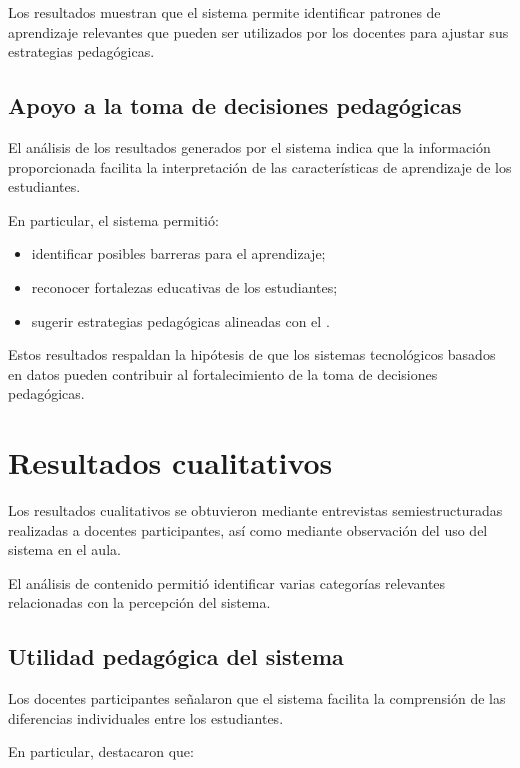 \begin{refsection}
\begin{table}[htbp]
\end{table}

Los resultados muestran que el sistema permite identificar patrones de aprendizaje relevantes que pueden ser utilizados por los docentes para ajustar sus estrategias pedagógicas.

\subsection{Apoyo a la toma de decisiones pedagógicas}

El análisis de los resultados generados por el sistema indica que la información proporcionada facilita la interpretación de las características de aprendizaje de los estudiantes.

En particular, el sistema permitió:

\begin{itemize}
\item identificar posibles barreras para el aprendizaje;
\item reconocer fortalezas educativas de los estudiantes;
\item sugerir estrategias pedagógicas alineadas con el \DUA.
\end{itemize}

Estos resultados respaldan la hipótesis de que los sistemas tecnológicos basados en datos pueden contribuir al fortalecimiento de la toma de decisiones pedagógicas.

\section{Resultados cualitativos}

Los resultados cualitativos se obtuvieron mediante entrevistas semiestructuradas realizadas a docentes participantes, así como mediante observación del uso del sistema en el aula.

El análisis de contenido permitió identificar varias categorías relevantes relacionadas con la percepción del sistema.

\subsection{Utilidad pedagógica del sistema}

Los docentes participantes señalaron que el sistema facilita la comprensión de las diferencias individuales entre los estudiantes.

En particular, destacaron que:


\end{refsection}
